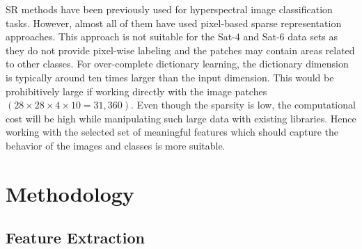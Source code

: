  SR methods have been previously used for hyperspectral image classification tasks\cite{Dundar2019, Pan2019, Li2018, Huang2017, Tang2014}. However, almost all of them have used pixel-based sparse representation approaches. This approach is not suitable for the Sat-4 and Sat-6 data sets as they do not provide pixel-wise labeling and the patches may contain areas related to other classes. For over-complete dictionary learning, the dictionary dimension is typically around ten times larger than the input dimension. This would be prohibitively large if working directly with the image patches $(28 \times 28 \times 4 \times 10 = 31,360)$. Even though the sparsity is low, the computational cost will be high while manipulating such large data with existing libraries. Hence working with the selected set of meaningful features which should capture the behavior of the images and classes is more suitable. 

\section{Methodology}

\subsection{Feature Extraction}

